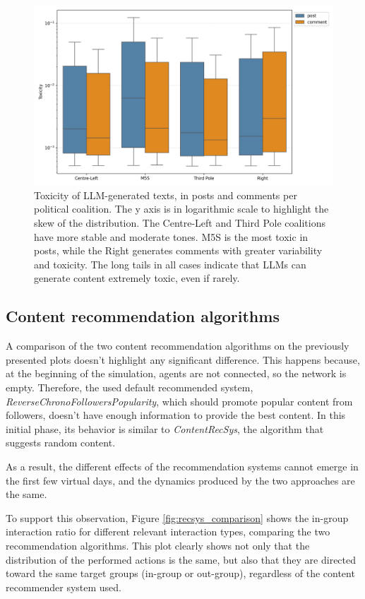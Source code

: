 \begin{figure}[h]
    \centering
    \includegraphics[width=0.6\linewidth]{Images/Toxicity/box_posts_vs_comments.png}
    \caption{Toxicity of LLM-generated texts, in posts and comments per political coalition.
    The y axis is in logarithmic scale to highlight the skew of the distribution.
    The Centre-Left and Third Pole coalitions have more stable and moderate tones.
    M5S is the most toxic in posts, while the Right generates comments with greater variability and toxicity.
    The long tails in all cases indicate that LLMs can generate content extremely toxic, even if rarely.}
    \label{fig:toxicity_box}
\end{figure}


\subsection{Content recommendation algorithms}
A comparison of the two content recommendation algorithms on the previously presented plots doesn't highlight any significant difference.
This happens because, at the beginning of the simulation, agents are not connected, so the network is empty.
Therefore, the used default recommended system, \textit{ReverseChronoFollowersPopularity}, which should promote popular content from followers, doesn't have enough information to provide the best content.
In this initial phase, its behavior is similar to \textit{ContentRecSys}, the algorithm that suggests random content.

As a result, the different effects of the recommendation systems cannot emerge in the first few virtual days, and the dynamics produced by the two approaches are the same.

To support this observation, Figure \ref{fig:recsys_comparison} shows the in-group interaction ratio for different relevant interaction types, comparing the two recommendation algorithms.
This plot clearly shows not only that the distribution of the performed actions is the same, but also that they are directed toward the same target groups (in-group or out-group), regardless of the content recommender system used.

